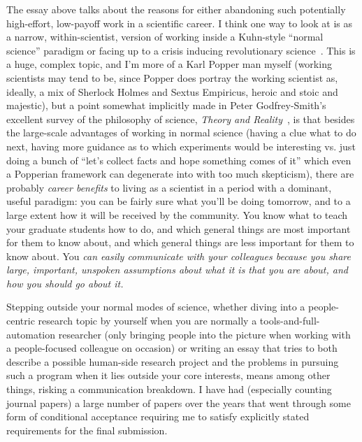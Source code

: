 \documentclass[sigplan,screen]{acmart}
\begin{document}
The essay above talks about the reasons for either abandoning such
potentially high-effort, low-payoff work in a scientific career.  I
think one way to look at is as a narrow, within-scientist, version of
working inside a Kuhn-style ``normal science'' paradigm or
facing up to a crisis inducing revolutionary
science~\cite{kuhn1997structure}.  This is a huge, complex topic, and
I'm more of a Karl Popper man myself (working scientists may tend to
be, since Popper does portray the working scientist as, ideally, a mix
of Sherlock Holmes and Sextus Empiricus, heroic and stoic and
majestic), but a point somewhat implicitly made in Peter Godfrey-Smith's excellent survey
of the philosophy of science, \emph{Theory and
  Reality}~\cite{godfrey2009theory}, is that besides the large-scale
advantages of working in normal science (having a clue what to do
next, having more guidance as to which experiments would be
interesting vs. just doing a bunch of ``let's collect facts and hope
something comes of it'' which even a Popperian framework can
degenerate into with too much skepticism), there are probably
\emph{career benefits} to living as a scientist in a period with a
dominant, useful paradigm:  you can be fairly sure what you'll be
doing tomorrow, and to a large extent how it will be received by the
community.  You know what to teach your graduate students how to do,
and which general things are most important for them to know about, and
which general things are less important for them to know about.  You
\emph{can easily communicate with your colleagues because you share
  large, important, unspoken assumptions about what it is that you are
  about, and how you should go about it.}

Stepping outside your normal modes of science, whether diving into a
people-centric research topic by yourself when you are normally a
tools-and-full-automation researcher (only bringing people into the
picture when working with a people-focused colleague on occasion) or
writing an essay that tries to both describe a possible human-side
research project and the problems in pursuing such a program when it
lies outside your core interests, means among other things, risking a
communication breakdown.  I have had (especially counting journal
papers) a large number of papers over the years that went through some
form of conditional acceptance requiring me to satisfy explicitly
stated requirements for the final submission.
\end{document}
